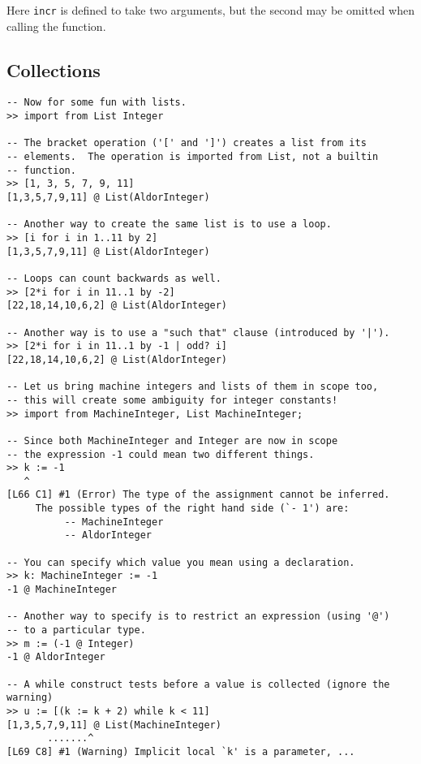 \documentclass{article}
\begin{document}
Here {\tt incr} is defined to take two arguments, but the
second may be omitted when calling the function.  

\subsection{Collections}

\begin{small}
\begin{verbatim}
-- Now for some fun with lists.
>> import from List Integer

-- The bracket operation ('[' and ']') creates a list from its
-- elements.  The operation is imported from List, not a builtin
-- function.  
>> [1, 3, 5, 7, 9, 11]
[1,3,5,7,9,11] @ List(AldorInteger)

-- Another way to create the same list is to use a loop.
>> [i for i in 1..11 by 2]
[1,3,5,7,9,11] @ List(AldorInteger)

-- Loops can count backwards as well.
>> [2*i for i in 11..1 by -2]
[22,18,14,10,6,2] @ List(AldorInteger)

-- Another way is to use a "such that" clause (introduced by '|').
>> [2*i for i in 11..1 by -1 | odd? i]
[22,18,14,10,6,2] @ List(AldorInteger)

-- Let us bring machine integers and lists of them in scope too,
-- this will create some ambiguity for integer constants!
>> import from MachineInteger, List MachineInteger;

-- Since both MachineInteger and Integer are now in scope
-- the expression -1 could mean two different things.
>> k := -1
   ^
[L66 C1] #1 (Error) The type of the assignment cannot be inferred.
     The possible types of the right hand side (`- 1') are:
          -- MachineInteger
          -- AldorInteger

-- You can specify which value you mean using a declaration.
>> k: MachineInteger := -1
-1 @ MachineInteger

-- Another way to specify is to restrict an expression (using '@')
-- to a particular type.
>> m := (-1 @ Integer)
-1 @ AldorInteger

-- A while construct tests before a value is collected (ignore the warning)
>> u := [(k := k + 2) while k < 11]
[1,3,5,7,9,11] @ List(MachineInteger)
       .......^
[L69 C8] #1 (Warning) Implicit local `k' is a parameter, ...



\end{verbatim}
\end{small}
\end{document}

